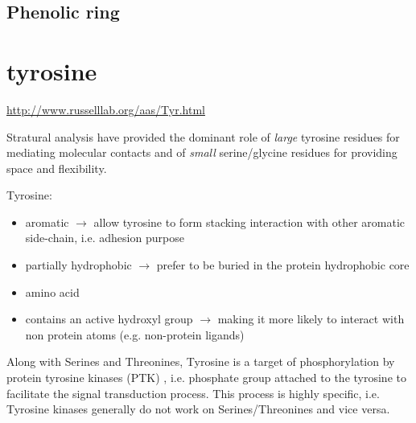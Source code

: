 \subsection{Phenolic ring}
\label{sec:phenolic-ring}



\section{tyrosine}
\label{sec:tyrosine}

\url{http://www.russelllab.org/aas/Tyr.html}

\begin{mdframed}

Stratural analysis have provided the dominant role of {\it large} tyrosine
residues for mediating molecular contacts and of {\it small} serine/glycine
residues for providing space and flexibility. \citep{koide2009}

\end{mdframed}

Tyrosine:
\begin{itemize}
  \item aromatic $\rightarrow$ allow tyrosine to form stacking interaction with
  other aromatic side-chain, i.e. adhesion purpose
  
  \item partially hydrophobic $\rightarrow$ prefer to be buried in the protein
  hydrophobic core
  
  \item amino acid
  
  \item contains an active hydroxyl group $\rightarrow$ making it more likely to
  interact with non protein atoms (e.g. non-protein ligands)
\end{itemize}

Along with Serines and Threonines, Tyrosine is a target of phosphorylation by
protein tyrosine kinases (PTK) \citep{hubbard2000}, i.e. phosphate group
attached to the tyrosine to facilitate the signal transduction process. This
process is highly specific, i.e.
Tyrosine kinases generally do not work on Serines/Threonines and vice versa.

